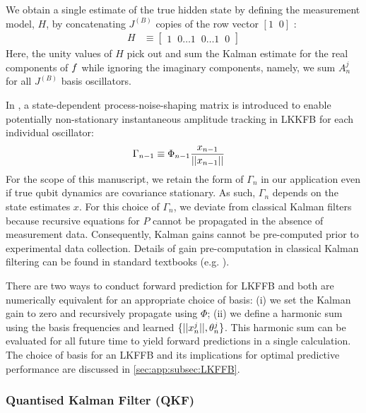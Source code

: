 We obtain a single estimate of the true hidden state by defining the measurement model, $H$, by concatenating $J^{(B)}$ copies of the row vector $[1\;\;0]$ :
\begin{align}
H & \equiv \begin{bmatrix} 1\;\;0 \hdots 1\;\;0 \hdots 1\;\;0 \end{bmatrix}
\end{align}
Here, the unity values of $H$ pick out and sum the Kalman estimate for the real components of $f$ while ignoring the imaginary components, namely, we sum $A^{j}_{n}$ for all $J^{(B)}$ basis oscillators.

In \cite{livska2007}, a state-dependent process-noise-shaping matrix is introduced to enable potentially non-stationary instantaneous amplitude tracking in LKKFB for each individual oscillator: 
\begin{align}
\Gamma_{n-1} &\equiv \Phi_{n-1}\frac{x_{n-1}}{||x_{n-1}||}
\end{align}
For the scope of this manuscript, we retain the form of $\Gamma_{n}$ in our application even if true qubit dynamics are covariance stationary. As such, $\Gamma_{n}$ depends on the state estimates $x$. For this choice of $\Gamma_{n}$, we deviate from classical Kalman filters because recursive equations for $P$ cannot be propagated in the absence of measurement data. Consequently, Kalman gains cannot be pre-computed prior to experimental data collection. Details of gain pre-computation in classical Kalman filtering can be found in standard textbooks (e.g. \cite{grewal2001theory}).

There are two ways to conduct forward prediction for LKFFB and both are numerically equivalent for an appropriate choice of basis: (i) we set the Kalman gain to zero and recursively propagate using $\Phi$; (ii) we define a harmonic sum using the basis frequencies and learned $\{||x^j_n||, \theta^{j}_{n} \}$.  This harmonic sum can be evaluated for all future time to yield forward predictions in a single calculation. The choice of basis for an LKFFB and its implications for optimal predictive performance are discussed in \cref{sec:app:subsec:LKFFB}.





\subsubsection{Quantised Kalman Filter (QKF)}

